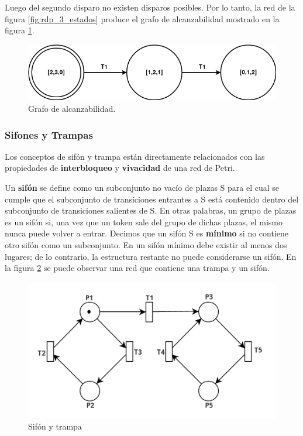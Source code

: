 Luego del segundo disparo no existen disparos posibles. Por lo tanto, la red de la figura \ref{fig:rdp_3_estados} produce el grafo de alcanzabilidad mostrado en la figura \ref{fig:grafo_alcanzabilidad}. \\

\begin{figure}[H]
    \centering
    \includegraphics[scale=0.4]{images/grafo_alcanzabilidad.png}
    \caption{Grafo de alcanzabilidad.}
    \label{fig:grafo_alcanzabilidad}
\end{figure}

\subsubsection{Sifones y Trampas}
Los conceptos de sifón y trampa están directamente relacionados con las propiedades de \textbf{interbloqueo} y \textbf{vivacidad} de una red de Petri.

Un \textbf{sifón} se define como un subconjunto no vacío de plazas S para el cual se cumple que el subconjunto de transiciones entrantes a S está contenido dentro del subconjunto de transiciones salientes de S.
En otras palabras, un grupo de plazas es un sifón si, una vez que un token sale del grupo de dichas plazas, el mismo nunca puede volver a entrar. 
Decimos que un sifón S es \textbf{mínimo} si no contiene otro sifón como un subconjunto. En un sifón mínimo debe existir al menos dos lugares; de lo contrario, la estructura restante no puede considerarse un sifón.
En la figura \ref{fig:rdp_sifon_trampa} se puede observar una red que contiene una trampa y un sifón.

\begin{figure}[H]
    \centering
    \includegraphics[width=0.8\linewidth]{images/rdp_sifon_trampa.png}
    \caption{Sifón y trampa}
    \label{fig:rdp_sifon_trampa}
\end{figure}

